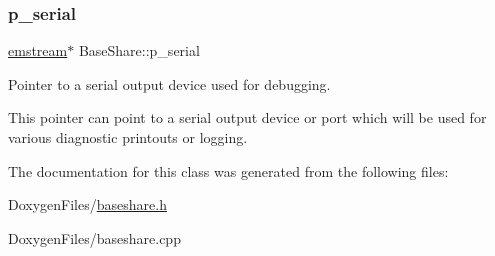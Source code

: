 \subsubsection{\texorpdfstring{p\+\_\+serial}{p\_serial}}
{\footnotesize\ttfamily \mbox{\hyperlink{classemstream}{emstream}}$\ast$ Base\+Share\+::p\+\_\+serial\hspace{0.3cm}{\ttfamily [protected]}}



Pointer to a serial output device used for debugging. 

This pointer can point to a serial output device or port which will be used for various diagnostic printouts or logging. 

The documentation for this class was generated from the following files\+:\begin{DoxyCompactItemize}
\item 
Doxygen\+Files/\mbox{\hyperlink{baseshare_8h}{baseshare.\+h}}\item 
Doxygen\+Files/baseshare.\+cpp\end{DoxyCompactItemize}
